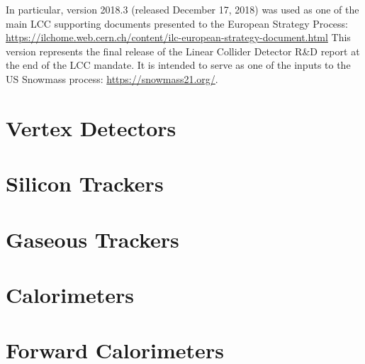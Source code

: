 \documentclass[10pt,final]{report}
\begin{document}
In particular, version 2018.3 (released December 17, 2018) was used as one of the main
LCC supporting documents presented to the European Strategy Process:
\url{https://ilchome.web.cern.ch/content/ilc-european-strategy-document.html}
This version represents the final release of the Linear Collider Detector R\&D report at the
end of the LCC mandate. It is intended to serve as one of the inputs to the US Snowmass
process: \url{https://snowmass21.org/}.

\chapter{Vertex Detectors}








\newpage

% 
\newpage
\chapter{Silicon Trackers}





\chapter{Gaseous Trackers}



\chapter{Calorimeters}













\chapter{Forward Calorimeters}



\end{document}
